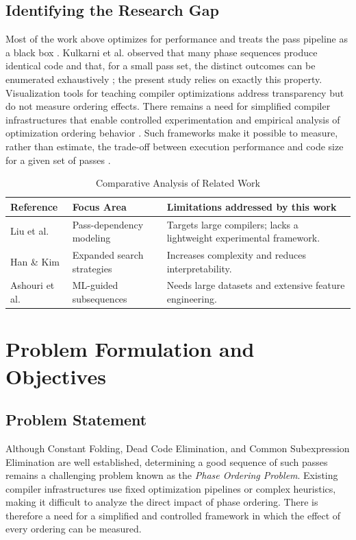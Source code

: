 \documentclass[conference]{IEEEtran}
\begin{document}
\subsection{Identifying the Research Gap}
Most of the work above optimizes for performance and treats the pass pipeline as a black box \cite{ref2}. Kulkarni et al. observed that many phase sequences produce identical code and that, for a small pass set, the distinct outcomes can be enumerated exhaustively \cite{ref19}; the present study relies on exactly this property. Visualization tools for teaching compiler optimizations \cite{ref30} address transparency but do not measure ordering effects. There remains a need for simplified compiler infrastructures that enable controlled experimentation and empirical analysis of optimization ordering behavior \cite{ref1}. Such frameworks make it possible to measure, rather than estimate, the trade-off between execution performance and code size for a given set of passes \cite{ref19}.

\begin{table}[htbp]
\caption{Comparative Analysis of Related Work}
\label{tab:lit_review}
\centering
\renewcommand{\arraystretch}{1.1}
\begin{tabularx}{\columnwidth}{@{}p{} p{} X@{}}
\toprule
\textbf{Reference} & \textbf{Focus Area} & \textbf{Limitations addressed by this work} \\
\midrule
Liu et al. \cite{ref1} & Pass-dependency modeling & Targets large compilers; lacks a lightweight experimental framework. \\
\addlinespace
Han \& Kim \cite{ref2} & Expanded search strategies & Increases complexity and reduces interpretability. \\
\addlinespace
Ashouri et al. \cite{ref15} & ML-guided subsequences & Needs large datasets and extensive feature engineering. \\
\bottomrule
\end{tabularx}
\end{table}

\section{Problem Formulation and Objectives}

\subsection{Problem Statement}
Although Constant Folding, Dead Code Elimination, and Common Subexpression Elimination are well established, determining a good sequence of such passes remains a challenging problem known as the \textit{Phase Ordering Problem}. Existing compiler infrastructures use fixed optimization pipelines or complex heuristics, making it difficult to analyze the direct impact of phase ordering. There is therefore a need for a simplified and controlled framework in which the effect of every ordering can be measured.
\end{document}
